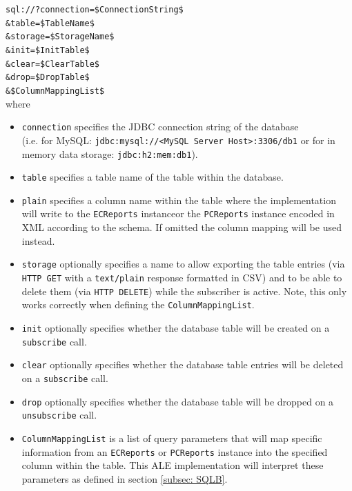 \documentclass[11pt,a4paper,oneside]{article}
\newif\ifincludecc
\begin{document}
\texttt{sql://?connection=\$ConnectionString\$}\\
\hspace*{2cm}\texttt{\&table=\$TableName\$}\\
\hspace*{2cm}\texttt{\&storage=\$StorageName\$}\\
\hspace*{2cm}\texttt{\&init=\$InitTable\$}\\
\hspace*{2cm}\texttt{\&clear=\$ClearTable\$}\\
\hspace*{2cm}\texttt{\&drop=\$DropTable\$}\\
\hspace*{2cm}\texttt{\&\$ColumnMappingList\$}\\

where
\begin{itemize}
\item 	 \texttt{connection} specifies the JDBC connection string of the database\\ (i.e. for MySQL: \texttt{jdbc:mysql://<MySQL Server Host>:3306/db1} or for in memory data storage: \texttt{jdbc:h2:mem:db1}).
\item 	 \texttt{table} specifies a table name of the table within the database. 
\item	 \texttt{plain} specifies a column name within the table where the implementation will write to the \texttt{ECReports} instance\ifincludecc , \texttt{CCReports} instance \fi or the \texttt{PCReports} instance encoded in XML according to the schema. If omitted the column mapping will be used instead.
\item	 \texttt{storage} optionally specifies a name to allow exporting the table entries (via \texttt{HTTP GET} with a \texttt{text/plain} response formatted in CSV) and to be able to delete them (via \texttt{HTTP DELETE}) while the subscriber is active. Note, this only works correctly when defining the \texttt{ColumnMappingList}.
\item	 \texttt{init} optionally specifies whether the database table will be created on a \texttt{subscribe} call.
\item	 \texttt{clear} optionally specifies whether the database table entries will be deleted on a \texttt{subscribe} call.
\item	 \texttt{drop} optionally specifies whether the database table will be dropped on a \texttt{unsubscribe} call.
\item	 \texttt{ColumnMappingList} is a list of query parameters that will map specific information from an \texttt{ECReports\ifincludecc , CCReports \fi} or \texttt{PCReports} instance into the specified column within the table. This ALE implementation will interpret these parameters as defined in section \ref{subsec: SQLB}.
\end{itemize}
\end{document}
